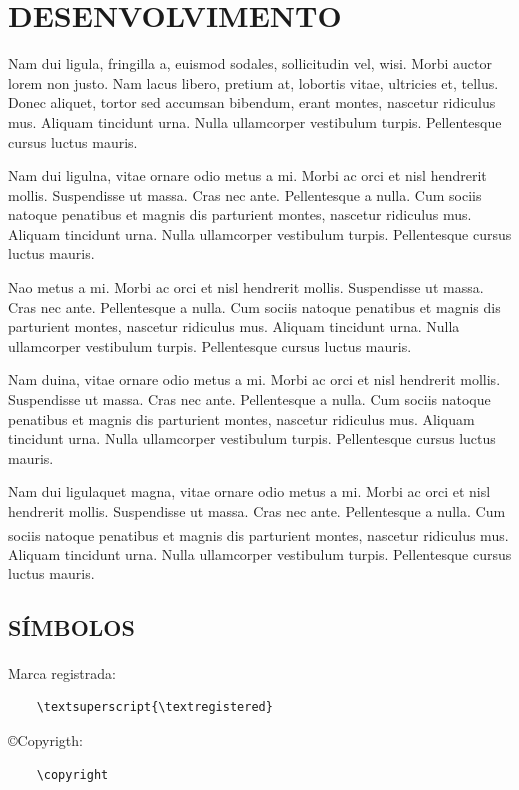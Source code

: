 \chapter{DESENVOLVIMENTO}

Nam dui ligula, fringilla a, euismod sodales, sollicitudin vel, wisi. Morbi auctor lorem non justo. Nam lacus libero, pretium at, lobortis vitae, ultricies et, tellus. Donec aliquet, tortor sed accumsan bibendum, erant montes, nascetur ridiculus mus. Aliquam tincidunt urna. Nulla ullamcorper vestibulum turpis. Pellentesque cursus luctus mauris. \cite{LUCKMANN2008}

Nam dui ligulna, vitae ornare odio metus a mi. Morbi ac orci et nisl hendrerit mollis. Suspendisse ut massa. Cras nec ante. Pellentesque a nulla. Cum sociis natoque penatibus et magnis dis parturient montes, nascetur ridiculus mus. Aliquam tincidunt urna. Nulla ullamcorper vestibulum turpis. Pellentesque cursus luctus mauris. \cite{Telles1984}

Nao metus a mi. Morbi ac orci et nisl hendrerit mollis. Suspendisse ut massa. Cras nec ante. Pellentesque a nulla. Cum sociis natoque penatibus et magnis dis parturient montes, nascetur ridiculus mus. Aliquam tincidunt urna. Nulla ullamcorper vestibulum turpis. Pellentesque cursus luctus mauris. \cite{abntex2-wiki-como-customizar}

Nam duina, vitae ornare odio metus a mi. Morbi ac orci et nisl hendrerit mollis. Suspendisse ut massa. Cras nec ante. Pellentesque a nulla. Cum sociis natoque penatibus et magnis dis parturient montes, nascetur ridiculus mus. Aliquam tincidunt urna. Nulla ullamcorper vestibulum turpis. Pellentesque cursus luctus mauris. \cite{abntex2modelo}

Nam dui ligulaquet magna, vitae ornare odio metus a mi. Morbi ac orci et nisl hendrerit mollis. Suspendisse ut massa. Cras nec ante. Pellentesque a nulla. Cum sociis natoque penatibus et magnis dis parturient montes, nascetur ridiculus mus\textsuperscript{\textregistered}. Aliquam tincidunt urna. Nulla ullamcorper vestibulum turpis. Pellentesque cursus luctus mauris. \cite{memoir}
\section{SÍMBOLOS}
Marca registrada\textsuperscript{\textregistered}:
	\begin{verbatim}
	\textsuperscript{\textregistered}
	\end{verbatim}

\copyright Copyrigth:
	\begin{verbatim}
	\copyright
	\end{verbatim}
	
